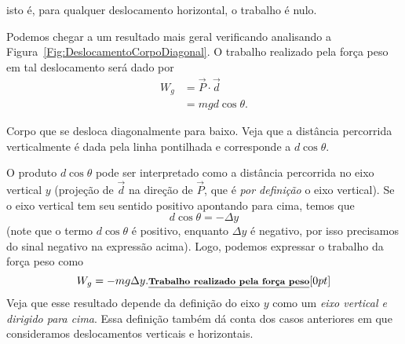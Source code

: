 \noindent{}isto é, para qualquer deslocamento horizontal, o trabalho é nulo.

Podemos chegar a um resultado mais geral verificando analisando a Figura~\ref{Fig:DeslocamentoCorpoDiagonal}. O trabalho realizado pela força peso em tal deslocamento será dado por
\begin{align}
  W_g &= \vec{P}\cdot\vec{d} \\
  &= mgd\cos\theta.
\end{align}

\begin{marginfigure}
\centering
{}
\caption{Corpo que se desloca diagonalmente para baixo. Veja que a distância percorrida verticalmente é dada pela linha pontilhada e corresponde a $d\cos\theta$. \label{Fig:DeslocamentoCorpoDiagonal}}
\end{marginfigure}
%
\noindent{}O produto $d\cos\theta$ pode ser interpretado como a distância percorrida no eixo vertical $y$ (projeção de $\vec{d}$ na direção de $\vec{P}$, que é \emph{por definição} o eixo vertical). Se o eixo vertical tem seu sentido positivo apontando para cima, temos que
\begin{equation}
    d\cos\theta = - \Delta y
\end{equation}
%
(note que o termo $d\cos\theta$ é positivo, enquanto $\Delta y$ é negativo, por isso precisamos do sinal negativo na expressão acima). Logo, podemos expressar o trabalho da força peso como
\begin{equation}\label{Eq:TrabalhoPeso}
  W_g = - mg\Delta y. \relax{\footnotesize\emph{\textbf{Trabalho realizado pela força peso}}}[0pt]
\end{equation}
%
Veja que esse resultado depende da definição do eixo $y$ como um \emph{eixo vertical e dirigido para cima}. Essa definição também dá conta dos casos anteriores em que consideramos deslocamentos verticais e horizontais.
  
